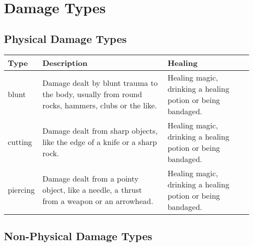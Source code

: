 \chapter{Damage Types}\label{ch:damageTypes}

\section{Physical Damage Types}\label{damagetypes:physical}

\begin{longtable}{l p{5cm} p{5cm}}
Type & Description & Healing \\ \hline
blunt  & Damage dealt by blunt trauma to the body, usually from round rocks, hammers, clubs or the like. & Healing magic, drinking a healing potion or being bandaged. \\
cutting & Damage dealt from sharp objects, like the edge of a knife or a sharp rock. & Healing magic, drinking a healing potion or being bandaged. \\
piercing & Damage dealt from a pointy object, like a needle, a thrust from a weapon or an arrowhead. & Healing magic, drinking a healing potion or being bandaged. \\
\end{longtable}

\section{Non-Physical Damage Types}\label{damagetypes:nonphysical}

